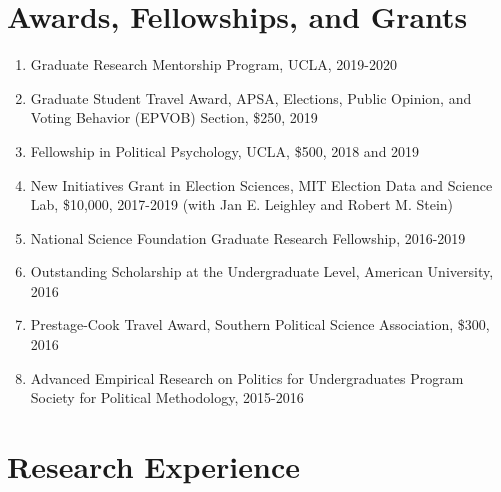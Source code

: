 \documentclass[11pt]{article}
\begin{document}
\section*{Awards, Fellowships, and Grants} 

\begin{enumerate}[topsep = 0pt, itemsep = 1ex, partopsep  = 1ex, parsep = 1ex]
	
	\item[] Graduate Research Mentorship Program, UCLA, 2019-2020
	
	\item[] Graduate Student Travel Award, APSA, Elections, Public Opinion, and Voting Behavior (EPVOB) Section, \$250, 2019
	
	\item[] Fellowship in Political Psychology, UCLA, \$500, 2018 and 2019
	
	\item[] New Initiatives Grant in Election Sciences, MIT Election Data and Science Lab, \$10,000, 2017-2019 (with Jan E. Leighley and Robert M. Stein)
	
	\item[] National Science Foundation Graduate Research Fellowship, 2016-2019
	
	\item[] Outstanding Scholarship at the Undergraduate Level, American University, 2016
	
	\item[] Prestage-Cook Travel Award, Southern Political Science Association, \$300, 2016
	
	\item[] Advanced Empirical Research on Politics for Undergraduates Program Society for Political Methodology, 2015-2016
	
\end{enumerate}

\section*{Research Experience}
 
\end{document}
